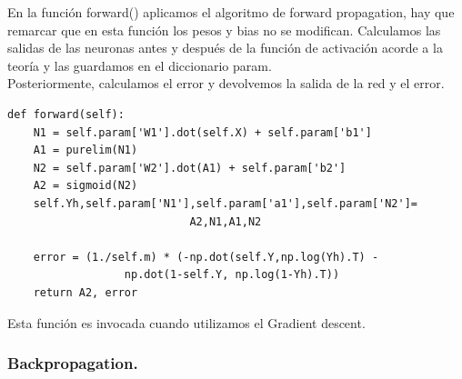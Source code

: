 \documentclass[a4paper,10pt]{article}
\begin{document}
En la función forward() aplicamos el algoritmo de forward propagation, hay que remarcar que en esta función los pesos y bias no se modifican. Calculamos las salidas de las neuronas antes y después de la función de activación acorde a la teoría y las guardamos en el diccionario param.\\ Posteriormente, calculamos el error y devolvemos la salida de la red y el error.
\begin{lstlisting}
def forward(self):
    N1 = self.param['W1'].dot(self.X) + self.param['b1']
    A1 = purelim(N1)
    N2 = self.param['W2'].dot(A1) + self.param['b2']
    A2 = sigmoid(N2)
    self.Yh,self.param['N1'],self.param['a1'],self.param['N2']=
						    A2,N1,A1,N2

    error = (1./self.m) * (-np.dot(self.Y,np.log(Yh).T) - 
			      np.dot(1-self.Y, np.log(1-Yh).T))
    return A2, error
\end{lstlisting}
Esta función es invocada cuando utilizamos el Gradient descent.
\subsubsection{Backpropagation.}
\end{document}
